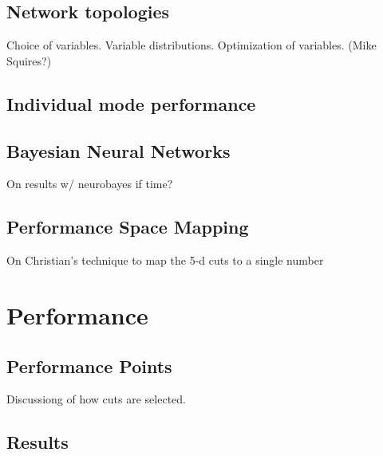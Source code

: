 \documentclass{article}
\begin{document}
\subsection{Network topologies}
Choice of variables.  Variable distributions.  Optimization of variables. (Mike Squires?)
\subsection{Individual mode performance}
\subsection{Bayesian Neural Networks}
On results w/ neurobayes if time?
\subsection{Performance Space Mapping}
On Christian's technique to map the 5-d cuts to a single number

\section{Performance}
\subsection{Performance Points}
Discussiong of how cuts are selected.
\subsection{Results}
\end{document}
